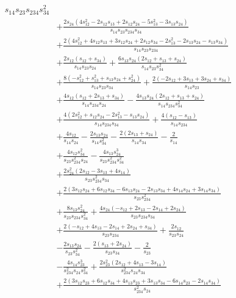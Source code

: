 \begin{align}
{s_{14}s_{23}s_{234}s_{34}^{2}}
 \nonumber \\
&+\frac{2s_{24}(4s_{12}^{2}-2s_{12}s_{13}+2s_{12}s_{24}
-5s_{13}^{2}-3s_{13}s_{24})}
{s_{14}s_{23}s_{234}s_{34}}
 \nonumber \\
&+\frac{2(4s_{12}^{2}+4s_{12}s_{13}+3s_{12}s_{24}
+2s_{12}s_{34}-2s_{13}^{2}-2s_{13}s_{24}-s_{13}s_{34})}
{s_{14}s_{23}s_{234}}
 \nonumber \\
&+\frac{2s_{12}(s_{12}+s_{34})}{s_{14}s_{23}s_{24}}
+\frac{6s_{13}s_{24}(2s_{12}+s_{13}+s_{24})}
{s_{14}s_{23}s_{34}^{2}}
 \nonumber \\
&+\frac{8(-s_{12}^{2}+s_{13}^{2}+s_{13}s_{24}+s_{24}^{2})}
{s_{14}s_{23}s_{34}}
+\frac{2(-2s_{12}+3s_{13}+3s_{24}+s_{34})}
{s_{14}s_{23}}
 \nonumber \\
&+\frac{4s_{12}(s_{12}+2s_{13}+s_{34})}
{s_{14}s_{234}s_{24}}
-\frac{4s_{13}s_{24}(2s_{12}+s_{13}+s_{24})}
{s_{14}s_{234}s_{34}^{2}}
 \nonumber \\
&+\frac{4(2s_{12}^{2}+s_{12}s_{24}-2s_{13}^{2}-s_{13}s_{24})}
{s_{14}s_{234}s_{34}}
+\frac{4(s_{12}-s_{13})}{s_{14}s_{234}}
 \nonumber \\
&+\frac{4s_{12}}{s_{14}s_{24}}
-\frac{2s_{13}s_{24}}{s_{14}s_{34}^{2}}
-\frac{2(2s_{13}+s_{24})}{s_{14}s_{34}}
-\frac{2}{s_{14}}
 \nonumber \\
&+\frac{4s_{12}s_{34}^{2}}{s_{23}s_{234}^{2}s_{24}}
-\frac{4s_{13}s_{24}^{3}}{s_{23}s_{234}^{2}s_{34}^{2}}
 \nonumber \\
&+\frac{2s_{24}^{2}(2s_{12}-3s_{13}+4s_{14})}
{s_{23}s_{234}^{2}s_{34}}
 \nonumber \\
&+\frac{2(3s_{12}s_{24}+6s_{12}s_{34}
-6s_{13}s_{24}-2s_{13}s_{34}
+4s_{14}s_{24}+3s_{14}s_{34})}
{s_{23}s_{234}^{2}}
 \nonumber \\
&+\frac{8s_{13}s_{24}^{2}}{s_{23}s_{234}s_{34}^{2}}
+\frac{4s_{24}(-s_{12}+2s_{13}-2s_{14}+2s_{24})}
{s_{23}s_{234}s_{34}}
 \nonumber \\
&+\frac{2(-s_{12}+4s_{13}-2s_{14}+2s_{24}+s_{34})}
{s_{23}s_{234}}
+\frac{2s_{12}}{s_{23}s_{24}}
 \nonumber \\
&-\frac{2s_{13}s_{24}}{s_{23}s_{34}^{2}}
-\frac{2(s_{13}+2s_{24})}{s_{23}s_{34}}
-\frac{2}{s_{23}}
 \nonumber \\
&-\frac{4s_{14}s_{23}^{3}}{s_{234}^{2}s_{24}s_{34}^{2}}
+\frac{2s_{23}^{2}(2s_{12}+4s_{13}-3s_{14})}
{s_{234}^{2}s_{24}s_{34}}
 \nonumber \\
&+\frac{2(3s_{12}s_{23}+6s_{12}s_{34}
+4s_{13}s_{23}+3s_{13}s_{34}
-6s_{14}s_{23}-2s_{14}s_{34})}
{s_{234}^{2}s_{24}}
 \nonumber \\

\end{align}
